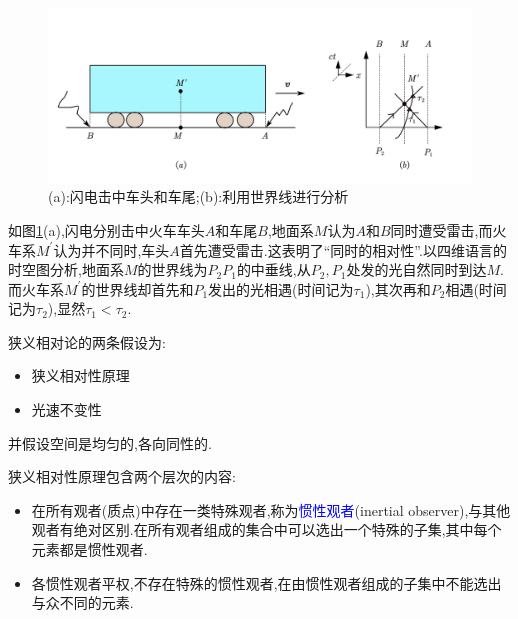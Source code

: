 \begin{figure}[htbp]
    \centering
 \includegraphics[width=\textwidth]{Pictures/6-3.png}
    \caption{(a):闪电击中车头和车尾;(b):利用世界线进行分析}
    \label{fig:6-3}
\end{figure}

如图\ref{fig:6-3}(a),闪电分别击中火车车头$A$和车尾$B$,地面系$M$认为$A$和$B$同时遭受雷击,而火车系$M^\prime$认为并不同时,车头$A$首先遭受雷击.这表明了“同时的相对性”.以四维语言的时空图分析,地面系$M$的世界线为$P_2P_1$的中垂线,从$P_2,P_1$处发的光自然同时到达$M$.而火车系$M^\prime$的世界线却首先和$P_1$发出的光相遇(时间记为$\tau_1$),其次再和$P_2$相遇(时间记为$\tau_2$),显然$\tau_1<\tau_2$.

狭义相对论的两条假设为:
\begin{itemize}
\item 狭义相对性原理
\item 光速不变性
\end{itemize}
并假设空间是均匀的,各向同性的.

狭义相对性原理包含两个层次的内容:
\begin{itemize}
    \item 在所有观者(质点)中存在一类特殊观者,称为\textcolor{blue}{惯性观者}(inertial observer),与其他观者有绝对区别.在所有观者组成的集合中可以选出一个特殊的子集,其中每个元素都是惯性观者.
    \item 各惯性观者平权,不存在特殊的惯性观者,在由惯性观者组成的子集中不能选出与众不同的元素.
\end{itemize}

